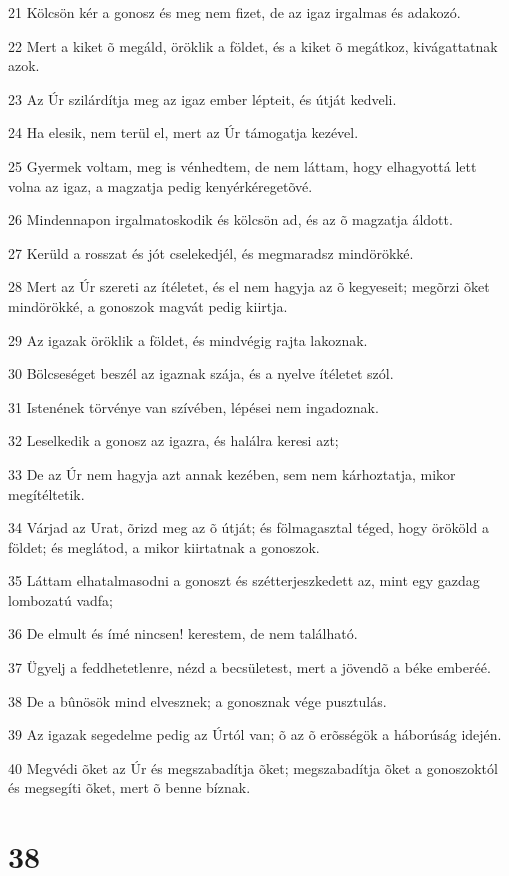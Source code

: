 \par 21 Kölcsön kér a gonosz és meg nem fizet, de az igaz irgalmas és adakozó.
\par 22 Mert a kiket õ megáld, öröklik a földet, és a kiket õ megátkoz, kivágattatnak azok.
\par 23 Az Úr szilárdítja meg az igaz ember lépteit, és útját kedveli.
\par 24 Ha elesik, nem terül el, mert az Úr támogatja kezével.
\par 25 Gyermek voltam, meg is vénhedtem, de nem láttam, hogy elhagyottá lett volna az igaz, a magzatja pedig kenyérkéregetõvé.
\par 26 Mindennapon irgalmatoskodik és kölcsön ad, és az õ magzatja áldott.
\par 27 Kerüld a rosszat és jót cselekedjél, és megmaradsz mindörökké.
\par 28 Mert az Úr szereti az ítéletet, és el nem hagyja az õ kegyeseit; megõrzi õket mindörökké, a gonoszok magvát pedig kiirtja.
\par 29 Az igazak öröklik a földet, és mindvégig rajta lakoznak.
\par 30 Bölcseséget beszél az igaznak szája, és a nyelve ítéletet szól.
\par 31 Istenének törvénye van szívében, lépései nem ingadoznak.
\par 32 Leselkedik a gonosz az igazra, és halálra keresi azt;
\par 33 De az Úr nem hagyja azt annak kezében, sem nem kárhoztatja, mikor megítéltetik.
\par 34 Várjad az Urat, õrizd meg az õ útját; és fölmagasztal téged, hogy örököld a földet; és meglátod, a mikor kiirtatnak a gonoszok.
\par 35 Láttam elhatalmasodni a gonoszt és szétterjeszkedett az, mint egy gazdag lombozatú vadfa;
\par 36 De elmult és ímé nincsen! kerestem, de nem található.
\par 37 Ügyelj a feddhetetlenre, nézd a becsületest, mert a jövendõ a béke emberéé.
\par 38 De a bûnösök mind elvesznek; a gonosznak vége pusztulás.
\par 39 Az igazak segedelme pedig az Úrtól van; õ az õ erõsségök a háborúság idején.
\par 40 Megvédi õket az Úr és megszabadítja õket; megszabadítja õket a gonoszoktól és megsegíti õket, mert õ benne bíznak.

\chapter{38}

